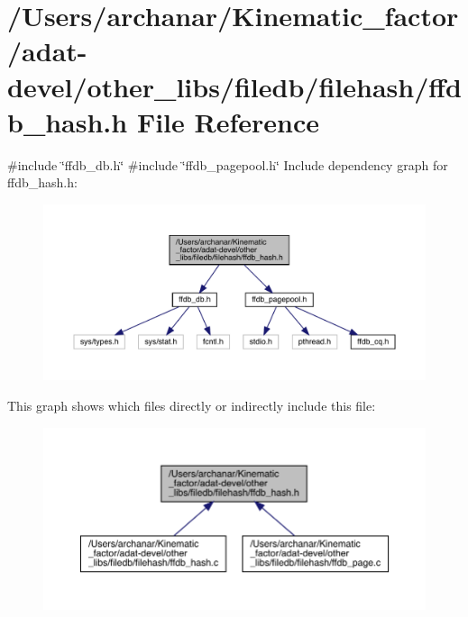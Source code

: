 \hypertarget{adat-devel_2other__libs_2filedb_2filehash_2ffdb__hash_8h}{}\section{/\+Users/archanar/\+Kinematic\+\_\+factor/adat-\/devel/other\+\_\+libs/filedb/filehash/ffdb\+\_\+hash.h File Reference}
\label{adat-devel_2other__libs_2filedb_2filehash_2ffdb__hash_8h}
{\ttfamily \#include \char`\"{}ffdb\+\_\+db.\+h\char`\"{}}\newline
{\ttfamily \#include \char`\"{}ffdb\+\_\+pagepool.\+h\char`\"{}}\newline
Include dependency graph for ffdb\+\_\+hash.\+h\+:
\nopagebreak
\begin{figure}[H]
\begin{center}
\leavevmode
\includegraphics[width=350pt]{da/dca/adat-devel_2other__libs_2filedb_2filehash_2ffdb__hash_8h__incl}
\end{center}
\end{figure}
This graph shows which files directly or indirectly include this file\+:
\nopagebreak
\begin{figure}[H]
\begin{center}
\leavevmode
\includegraphics[width=350pt]{db/d2d/adat-devel_2other__libs_2filedb_2filehash_2ffdb__hash_8h__dep__incl}
\end{center}
\end{figure}
